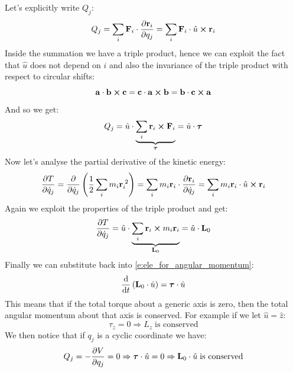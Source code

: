 Let's explicitly write $Q_j$:
\begin{equation}
    Q_j = \bigsum_i \vec{F}_i \cdot \pdv{\vec{r}_i}{q_j} = \bigsum_i \vec{F}_i \cdot \hat{u} \cross \vec{r}_i
\end{equation}
Inside the summation we have a triple product, hence we can exploit the fact that $\hat{u}$ does not depend on $i$ and also the invariance of the triple product with respect to circular shifts:
\begin{equation}
    \vb{a} \cdot \vb{b} \cross \vb{c} = \vb{c} \cdot \vb{a} \cross \vb{b} = \vb{b} \cdot \vb{c} \cross \vb{a}
\end{equation}
And so we get:
\begin{equation}
    Q_j = \hat{u} \cdot \underbrace{\displaystyle\sum_i \vb{r}_i \cross \vb{F}_i}_{\boldsymbol{\tau}} = \hat{u} \cdot \boldsymbol{\tau}
\end{equation}
Now let's analyse the partial derivative of the kinetic energy:
\begin{equation}
    \pdv{T}{\dot{q}_j} = \pdv{}{\dot{q}_j}\brackets{\dfrac{1}{2}\bigsum_i m_i \vec{r}_i^{\;2}} = \bigsum_i m_i \vec{r}_i \cdot \pdv{\vec{r}_i}{\dot{q}_j} = \bigsum_i m_i \vec{r}_i \cdot \hat{u} \cross \vec{r}_i
\end{equation}
Again we exploit the properties of the triple product and get:
\begin{equation}
    \pdv{T}{\dot{q}_j} =   \hat{u} \cdot \underbrace{\bigsum_i \vec{r}_i \cross m_i \vec{r}_i}_{\vec{L}_0} = \hat{u} \cdot \vec{L}_0
\end{equation}
Finally we can substitute back into \eqref{e:ele_for_angular_momentum}:
\begin{equation}
    \dv{}{t}\brackets{\vec{L}_0 \cdot \hat{u}} = \boldsymbol{\tau} \cdot \hat{u}
\end{equation}
This means that if the total torque about a generic axis is zero, then the total angular momentum about that axis is conserved. For example if we let $\hat{u} = \hat{z}$:
\begin{equation}
    \tau_z = 0 \Rightarrow L_z\;\text{is conserved}
\end{equation}
We then notice that if $q_j$ is a cyclic coordinate we have:
\begin{equation}
    Q_j = -\pdv{V}{q_j} = 0 \Rightarrow \boldsymbol{\tau} \cdot \hat{u} = 0 \Rightarrow \vec{L}_0 \cdot \hat{u}\;\text{is conserved}
\end{equation}

